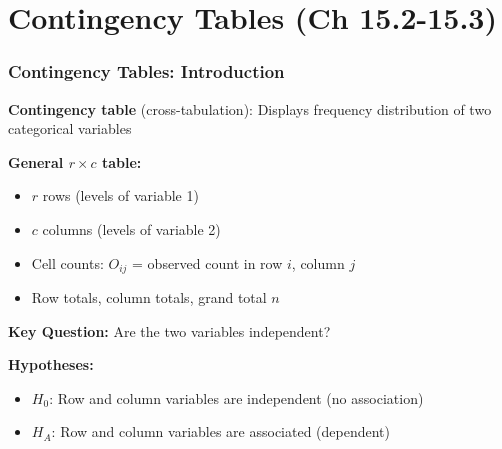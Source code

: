\documentclass{beamer}
\begin{document}
\section{Contingency Tables (Ch 15.2-15.3)}

\begin{frame}
\frametitle{Contingency Tables: Introduction}
\textbf{Contingency table} (cross-tabulation): Displays frequency distribution of two categorical variables

\vspace{0.5cm}
\textbf{General $r \times c$ table:}
\begin{itemize}
\item $r$ rows (levels of variable 1)
\item $c$ columns (levels of variable 2)
\item Cell counts: $O_{ij}$ = observed count in row $i$, column $j$
\item Row totals, column totals, grand total $n$
\end{itemize}

\vspace{0.5cm}
\textbf{Key Question:} Are the two variables independent?

\vspace{0.3cm}
\textbf{Hypotheses:}
\begin{itemize}
\item $H_0$: Row and column variables are independent (no association)
\item $H_A$: Row and column variables are associated (dependent)
\end{itemize}
\end{frame}
\end{document}
